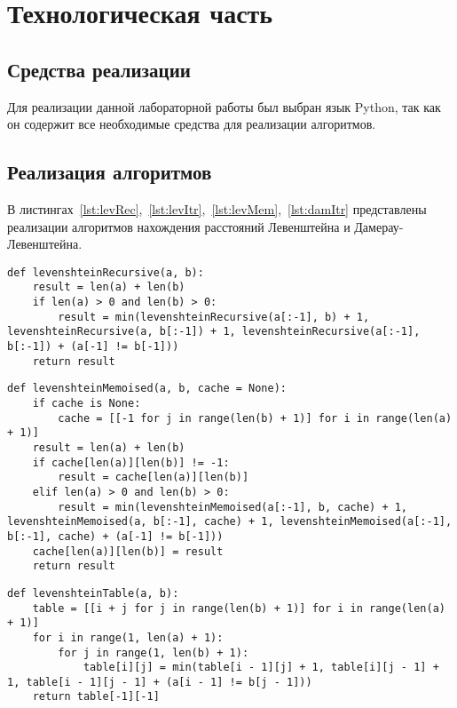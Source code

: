 \chapter{Технологическая часть}

\section{Средства реализации}

Для реализации данной лабораторной работы был выбран язык Python, так как он содержит все необходимые средства для реализации алгоритмов.

\section{Реализация алгоритмов}

В листингах~\ref{lst:levRec},~\ref{lst:levItr},~\ref{lst:levMem},~\ref{lst:damItr} представлены реализации алгоритмов нахождения расстояний Левенштейна и Дамерау-Левенштейна.

\begin{lstlisting}[label=lst:levRec,caption=Метод рекурсивного нахождения расстояния Левенштейна]
def levenshteinRecursive(a, b):
	result = len(a) + len(b)
	if len(a) > 0 and len(b) > 0:
		result = min(levenshteinRecursive(a[:-1], b) + 1, levenshteinRecursive(a, b[:-1]) + 1, levenshteinRecursive(a[:-1], b[:-1]) + (a[-1] != b[-1]))
	return result
\end{lstlisting}

\begin{lstlisting}[label=lst:levMem,caption=Метод рекурсивного нахождения расстояния Левенштейна с мемоизацией]
def levenshteinMemoised(a, b, cache = None):
	if cache is None:
		cache = [[-1 for j in range(len(b) + 1)] for i in range(len(a) + 1)]
	result = len(a) + len(b)
	if cache[len(a)][len(b)] != -1:
		result = cache[len(a)][len(b)]
	elif len(a) > 0 and len(b) > 0:
		result = min(levenshteinMemoised(a[:-1], b, cache) + 1, levenshteinMemoised(a, b[:-1], cache) + 1, levenshteinMemoised(a[:-1], b[:-1], cache) + (a[-1] != b[-1]))
	cache[len(a)][len(b)] = result
	return result
\end{lstlisting}

\begin{lstlisting}[label=lst:levItr,caption=Метод матричного нахождения расстояния Левенштейна]
def levenshteinTable(a, b):
	table = [[i + j for j in range(len(b) + 1)] for i in range(len(a) + 1)]
	for i in range(1, len(a) + 1):
		for j in range(1, len(b) + 1):
			table[i][j] = min(table[i - 1][j] + 1, table[i][j - 1] + 1, table[i - 1][j - 1] + (a[i - 1] != b[j - 1]))
	return table[-1][-1]
\end{lstlisting}

